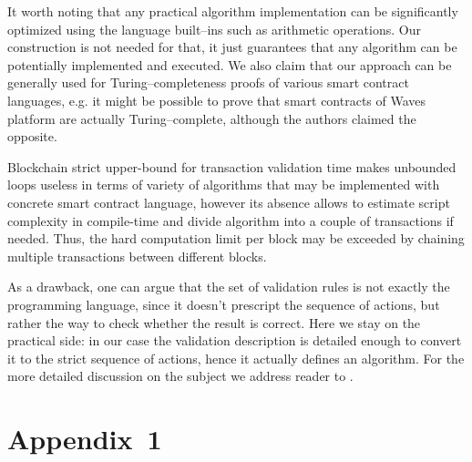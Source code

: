 \documentclass[runningheads]{llncs}
\begin{document}
    It worth noting that any practical algorithm implementation can be
    significantly optimized using the language built--ins such as arithmetic
    operations. Our construction is not needed for that, it just
    guarantees that any algorithm can be potentially implemented and executed.
    We also claim that our approach can be generally used for Turing--completeness
    proofs of various smart contract languages, e.g. it might be possible to prove
    that smart contracts of Waves platform \cite{wavesSmarts} are actually
    Turing--complete, although the authors claimed the opposite.

    Blockchain strict upper-bound for transaction validation time makes unbounded
    loops useless in terms of variety of algorithms that may be implemented
    with concrete smart contract language, however its absence allows to
    estimate script complexity in compile-time and divide algorithm into
    a couple of transactions if needed. Thus, the hard computation limit per block %
    may be exceeded by chaining multiple transactions between different blocks. %

    As a drawback, one can argue that the set of validation rules is not exactly
    the programming language, since it doesn't prescript the sequence of actions,
    but rather the way to check whether the result is correct. Here we stay on the
    practical side: in our case the validation description is detailed enough to
    convert it to the strict sequence of actions, hence it actually defines an
    algorithm. For the more detailed discussion on the subject we address reader
    to .

    
    \section{Appendix~1}
    \label{appendix1}

\end{document}
